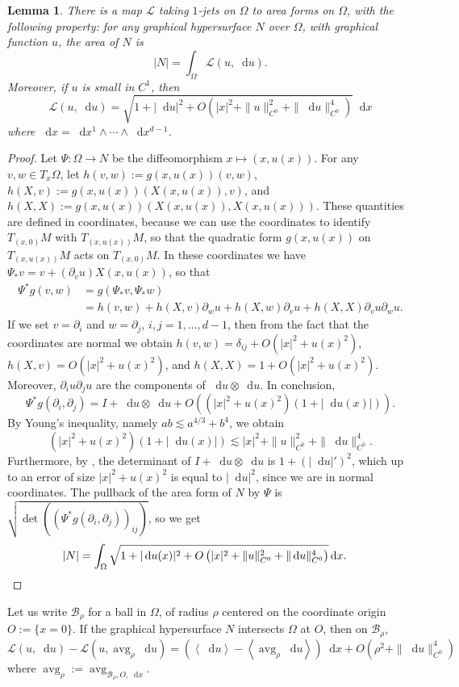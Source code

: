 \documentclass[reqno,11pt]{amsart}
\DeclareMathOperator{\avg}{avg}
\newcommand*\dif{\mathop{}\!\mathrm{d}}
\newcommand{\Lagrange}{\mathscr L}
\def\Japan#1{\left \langle #1 \right \rangle}
\newtheorem{lemma}[theorem]{Lemma}
\theoremstyle{definition}
\numberwithin{equation}{section}
\begin{document}
\begin{lemma}
There is a map $\Lagrange$ taking $1$-jets on $\Omega$ to area forms on $\Omega$, with the following property: for any graphical hypersurface $N$ over $\Omega$, with graphical function $u$, the area of $N$ is
$$|N| = \int_\Omega \Lagrange(u, \dif u).$$
Moreover, if $u$ is small in $C^1$, then
$$\Lagrange(u, \dif u) = \sqrt{1 + |\dif u|^2 + O(|x|^2 + \|u\|_{C^0}^2 + \|\dif u\|_{C^0}^4)} \dif x$$
where $\dif x = \dif x^1 \wedge \cdots \wedge \dif x^{d - 1}$.
\end{lemma}
\begin{proof}
Let $\Psi: \Omega \to N$ be the diffeomorphism $x \mapsto (x, u(x))$.
For any $v, w \in T_x \Omega$, let $h(v, w) := g(x, u(x))(v, w)$, $h(X, v) := g(x, u(x))(X(x, u(x)), v)$, and $h(X, X) := g(x, u(x))(X(x, u(x)), X(x, u(x)))$.
These quantities are defined in coordinates, because we can use the coordinates to identify $T_{(x, 0)}M$ with $T_{(x, u(x))} M$, so that the quadratic form $g(x, u(x))$ on $T_{(x, u(x))} M$ acts on $T_{(x, 0)}M$.
In these coordinates we have $\Psi_* v = v + (\partial_v u) X(x, u(x))$, so that
\begin{align*}
\Psi^* g(v, w)
&= g(\Psi_* v, \Psi_* w) \\
&= h(v, w) + h(X, v) \partial_w u + h(X, w) \partial_v u + h(X, X) \partial_v u \partial_w u.
\end{align*}
If we set $v = \partial_i$ and $w = \partial_j$, $i, j = 1, \dots, d - 1$, then from the fact that the coordinates are normal we obtain $h(v, w) = \delta_{ij} + O(|x|^2 + u(x)^2)$, $h(X, v) = O(|x|^2 + u(x)^2)$, and $h(X, X) = 1 + O(|x|^2 + u(x)^2)$.
Moreover, $\partial_i u \partial_j u$ are the components of $\dif u \otimes \dif u$.
In conclusion,
$$\Psi^* g(\partial_i, \partial_j) = I + \dif u \otimes \dif u + O((|x|^2 + u(x)^2)(1 + |\dif u(x)|)).$$
By Young's inequality, namely $ab \lesssim a^{4/3} + b^4$, we obtain
$$(|x|^2 + u(x)^2)(1 + |\dif u(x)|) \lesssim |x|^2 + \|u\|_{C^0}^2 + \|\dif u\|_{C^0}^4.$$
Furthermore, by \cite[(24)]{Petersen2008}, the determinant of $I + \dif u \otimes \dif u$ is $1 + (|\dif u|')^2$, which up to an error of size $|x|^2 + u(x)^2$ is equal to $|\dif u|^2$, since we are in normal coordinates.
The pullback of the area form of $N$ by $\Psi$ is $\sqrt{\det((\Psi^* g(\partial_i, \partial_j))_{ij})}$, so we get 
\begin{align*}
|N| &= \int_\Omega \sqrt{1 + |\dif u(x)|^2 + O\left(|x|^2 + \|u\|_{C^0}^2 + \|\dif u\|_{C^0}^4\right)} \dif x. \qedhere
\end{align*}
\end{proof}

Let us write $\mathscr B_\rho$ for a ball in $\Omega$, of radius $\rho$ centered on the coordinate origin $O := \{x = 0\}$.
If the graphical hypersurface $N$ intersects $\Omega$ at $O$, then on $\mathscr B_\rho$,
\begin{equation}\label{approximate by euclidean lagrangian}
\Lagrange(u, \dif u) - \Lagrange(u, \avg_\rho \dif u) = \left(\Japan{\dif u} - \Japan{\avg_\rho \dif u}\right) \dif x + O\left(\rho^2 + \|\dif u\|_{C^0}^4\right)
\end{equation}
where $\avg_\rho := \avg_{\mathscr B_\rho, O, \dif x}$. 


\printbibliography
\end{document}
